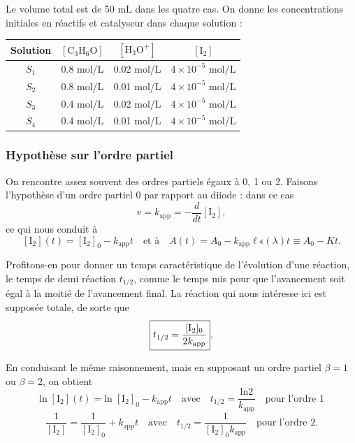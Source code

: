 \documentclass[11pt,a4paper]{report}
\begin{document}
Le volume total est de 50 mL dans les quatre cas. On donne les concentrations initiales en réactifs et catalyseur dans chaque solution :
\begin{center}
	\begin{tabular}{|c|c|c|c|}
	\hline
	\textbf{Solution}&$[\text{C}_3\text{H}_6\text{O}]$ &$[\text{H}_3\text{O}^+]$& $[\text{I}_2]$\\
	\hline
	$S_1$ & 0.8 mol/L & 0.02 mol/L & $4\times10^{-5}$ mol/L\\
	$S_2$ & 0.8 mol/L & 0.01 mol/L & $4\times10^{-5}$ mol/L\\
	$S_3$ & 0.4 mol/L & 0.02 mol/L & $4\times10^{-5}$ mol/L\\
	$S_4$ & 0.4 mol/L & 0.01 mol/L & $4\times10^{-5}$ mol/L\\
	\hline
	\end{tabular}
\end{center}

\subsubsection{Hypothèse sur l'ordre partiel}

On rencontre assez souvent des ordres partiels égaux à 0, 1 ou 2. Faisons l'hypothèse d'un ordre partiel 0 par rapport au diiode : dans ce cas
\begin{equation}
	v = k_\text{app} = -\frac{d}{dt}[\text{I}_2],
\end{equation} 
ce qui nous conduit à
\begin{equation}
	\boxed{[\text{I}_2](t) = [\text{I}_2]_0 -k_\text{app}t \quad\text{et à}\quad 
	A(t) = A_0 - k_\text{app}\ell \epsilon(\lambda) t \equiv A_0 - Kt}.
\end{equation}

Profitons-en pour donner un temps caractéristique de l'évolution d'une réaction, le temps de demi réaction $t_{1/2}$, comme le temps mis pour que l'avancement soit égal à la moitié de l'avancement final. La réaction qui nous intéresse ici est supposée totale, de sorte que
\begin{equation}
	\boxed{t_{1/2} = \frac{[\text{I}_2]_0}{2k_\text{app}}}.\\
\end{equation}

En conduisant le même raisonnement, mais en supposant un ordre partiel $\beta = 1$ ou $\beta = 2$, on obtient
\begin{equation}
	\boxed{\text{ln}\;[\text{I}_2](t) = \text{ln}\;[\text{I}_2]_0 - k_\text{app}t
	\quad\text{avec}\quad t_{1/2} = \frac{\text{ln}2}{k_\text{app}}
	\quad\text{pour l'ordre 1}}
\end{equation}
\begin{equation}
	\boxed{\frac{1}{[\text{I}_2]} = \frac{1}{[\text{I}_2]_0} + k_\text{app}t
	\quad\text{avec}\quad t_{1/2} = \frac{1}{[\text{I}_2]_0 k_\text{app}}
	\quad\text{pour l'ordre 2}}.
\end{equation}
\end{document}
